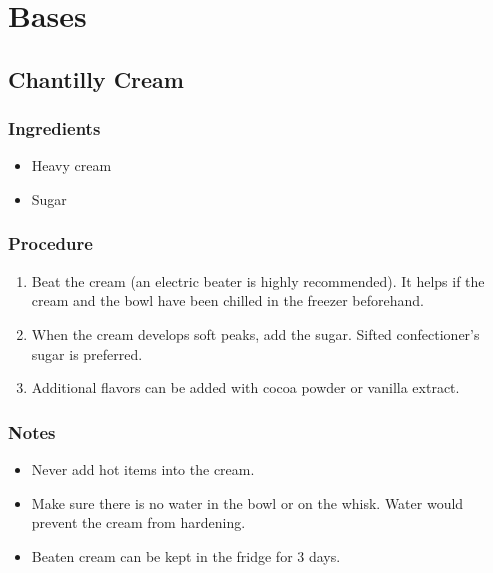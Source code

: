 \documentclass[10pt]{book}
\begin{document}
\pagestyle{plain}
\tableofcontents
\newpage
{}

\small


\chapter*{Bases}

\newpage
\section*{Chantilly Cream}
\subsection*{Ingredients}
	\begin{itemize}
		\item Heavy cream
		\item Sugar
	\end{itemize}
\subsection*{Procedure}
	\begin{enumerate}
		\item Beat the cream (an electric beater is highly recommended).  It helps if the cream and the bowl have been chilled in the freezer beforehand.
		\item When the cream develops soft peaks, add the sugar. Sifted confectioner's sugar is preferred.
		\item Additional flavors can be added with cocoa powder or vanilla extract.
	\end{enumerate}
\subsection*{Notes}
	\begin{itemize}
		\item Never add hot items into the cream.
		\item Make sure there is no water in the bowl or on the whisk. Water would prevent the cream from hardening.
		\item Beaten cream can be kept in the fridge for 3 days.
	\end{itemize}
	
\end{document}
